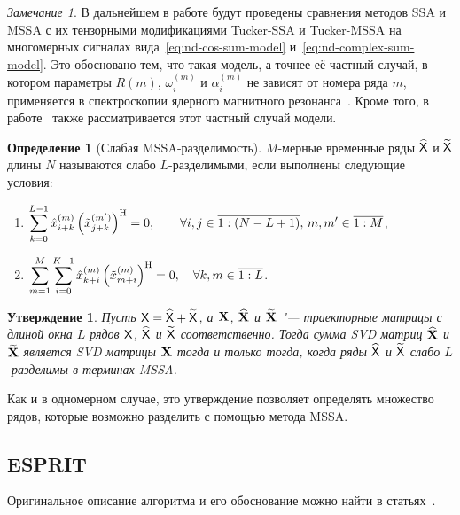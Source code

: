\documentclass[specialist,
  substylefile = spbu.rtx,
subf,href,colorlinks=true, 12pt]{disser}
\theoremstyle{plain}
\newtheorem{statement}{Утверждение}[section]
\theoremstyle{definition}
\newtheorem{definition}{Определение}[section]
\theoremstyle{remark}
\newtheorem{remark}{Замечание}[section]
\def\tssa/{Tucker-SSA}
\def\tmssa/{Tucker-MSSA}
\begin{document}
\begin{remark}\label{remark:model-justification}
  В дальнейшем в работе будут проведены сравнения методов SSA и MSSA
  с их тензорными модификациями
  \tssa/ и \tmssa/ на многомерных сигналах вида~\eqref{eq:nd-cos-sum-model}
  и~\eqref{eq:nd-complex-sum-model}.
  Это обосновано тем, что такая модель, а точнее её частный случай, в
  котором параметры $R(m)$, $\omega_i^{(m)}$
  и $\alpha_i^{(m)}$ не зависят от номера ряда $m$, применяется в
  спектроскопии ядерного магнитного
  резонанса~\cite{NMR}.
  Кроме того, в работе~\cite{hosvd-hooi-separation} также
  рассматривается этот частный случай модели.
\end{remark}

\begin{definition}[Слабая MSSA-разделимость]
  \label{def:mssa-separability}
  $M$-мерные временные ряды $\widehat{\mathsf{X}}$ и $\widetilde{\mathsf{X}}$ длины
  $N$ называются слабо $L$-разделимыми, если
  выполнены следующие условия:
  \begin{enumerate}
    \item $\displaystyle \sum_{k=0}^{L-1}
      \hat{x}_{i+k}^{(m)}\left(\tilde{x}_{j+k}^{(m')}\right)^{\mathrm{H}} = 0,
      \qquad \forall i, j \in \overline{1:(N-L+1)},\, m, m' \in
      \overline{1:M}$,
    \item $\displaystyle \sum_{m=1}^{M} \sum_{i=0}^{K-1}
      \hat{x}_{k+i}^{(m)} \left(\tilde{x}_{m+i}^{(m)}\right)^{\mathrm{H}} = 0, \quad
      \forall k, m \in \overline{1:L}$.
  \end{enumerate}
\end{definition}

\begin{statement}
  \label{state:mssa-separability}
  Пусть $\mathsf{X} = \widehat{\mathsf{X}} + \widetilde{\mathsf{X}}$, а $\mathbf{X}$,
  $\widehat{\mathbf{X}}$ и $\widetilde{\mathbf{X}}$ "--- траекторные
  матрицы с длиной окна $L$ рядов $\mathsf{X}$, $\widehat{\mathsf{X}}$ и
  $\widetilde{\mathsf{X}}$ соответственно.
  Тогда сумма \emph{SVD} матриц $\widehat{\mathbf{X}}$ и $\widetilde{\mathbf{X}}$
  является \emph{SVD} матрицы $\mathbf{X}$ тогда и только тогда, когда
  ряды $\widehat{\mathsf{X}}$ и $\widetilde{\mathsf{X}}$ слабо $L$-разделимы в
  терминах MSSA.
\end{statement}
Как и в одномерном случае, это утверждение позволяет определять
множество рядов, которые возможно разделить с
помощью метода MSSA.

\subsection{ESPRIT}\label{subsec:esprit}
Оригинальное описание алгоритма и его обоснование
можно найти в статьях~\cite{esprit,hosvd-hooi-separation}.
\end{document}
